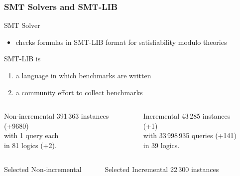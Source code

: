 \documentclass[table]{beamer}
\def\emph#1{\textcolor{MYblue}{#1}}
\begin{document}
\begin{frame}
  \frametitle{SMT Solvers and SMT-LIB}
  SMT Solver
  \begin{itemize}
  \item checks formulas
    in \emph{SMT-LIB} format
    for \emph{satisfiability modulo theories}
  \end{itemize}
  \bigskip

  SMT-LIB is
  \begin{enumerate}
  \item a \emph{language} in which benchmarks are written
  \item a community effort to \emph{collect benchmarks}
  \end{enumerate}
  \medskip

  \begin{columns}
    \begin{column}{0.4\textwidth}
      \begin{block}{Non-incremental}
        391\,363 instances {\small (+9680)}\\
        with 1 query each \\
        in 81 logics {\small (+2)}.
      \end{block}
    \end{column}
    \begin{column}{0.4\textwidth}
      \begin{block}{Incremental}
        43\,285 instances {\small (+1)}\\
        with 33\,998\,935 queries {\small (+141)} \\
        in 39 logics.
      \end{block}
    \end{column}
    \begin{column}{0.08\textwidth}
    \end{column}
  \end{columns}
  \pause
    \begin{columns}
    \begin{column}{0.4\textwidth}
      \begin{block}{Selected Non-incremental}
      \end{block}
    \end{column}
    \begin{column}{0.4\textwidth}
      \begin{block}{Selected Incremental}
        22\,300 instances
      \end{block}
    \end{column}
    \begin{column}{0.08\textwidth}
    \end{column}
  \end{columns}

\end{frame}
\end{document}
